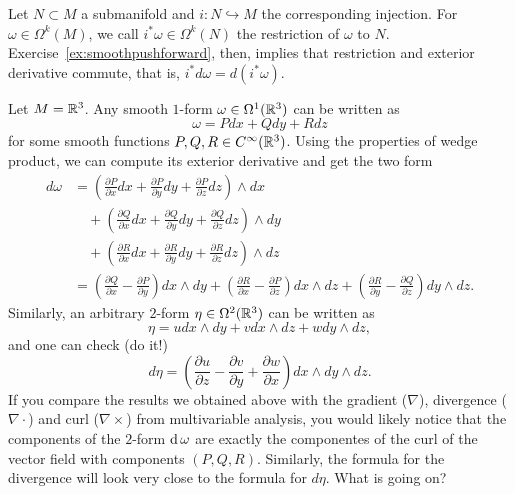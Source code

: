 Let $N\subset M$ a submanifold and $i:N\hookrightarrow M$ the corresponding injection.
For $\omega\in\Omega^k(M)$, we call $i^*\omega \in \Omega^k(N)$ the restriction of $\omega$ to $N$.
Exercise~\ref{ex:smoothpushforward}, then, implies that restriction and exterior derivative commute, that is, $i^*d\omega = d(i^*\omega)$.

\begin{example}
  Let $M=\mathbb{R}^3$. Any smooth $1$-form $\omega\in\Omega^1(\mathbb{R}^3)$ can be written as
  \begin{equation}
    \omega = P dx + Q dy + R dz
  \end{equation}
  for some smooth functions $P,Q,R\in C^\infty(\mathbb{R}^3)$.
  Using the properties of wedge product, we can compute its exterior derivative and get the two form
  \begin{align}
    d\omega &= \left(\frac{\partial P}{\partial x} dx + \frac{\partial P}{\partial y} dy + \frac{\partial P}{\partial z} dz \right) \wedge dx \\
      &\quad+\left(\frac{\partial Q}{\partial x} dx + \frac{\partial Q}{\partial y} dy + \frac{\partial Q}{\partial z} dz \right) \wedge dy \\
      &\quad+\left(\frac{\partial R}{\partial x} dx + \frac{\partial R}{\partial y} dy + \frac{\partial R}{\partial z} dz \right) \wedge dz \\
    &= \left(\frac{\partial Q}{\partial x} - \frac{\partial P}{\partial y}\right) dx \wedge dy + 
    \left(\frac{\partial R}{\partial x} - \frac{\partial P}{\partial z}\right) dx \wedge dz + \left(\frac{\partial R}{\partial y} - \frac{\partial Q}{\partial z}\right) dy \wedge dz.
  \end{align}
  Similarly, an arbitrary $2$-form $\eta\in\Omega^2(\mathbb{R}^3)$ can be written as
  \begin{equation}
    \eta = u dx\wedge dy + v dx\wedge dz + w dy\wedge dz,
  \end{equation}
  and one can check (do it!)
  \begin{equation}
    d\eta = \left(\frac{\partial u}{\partial z}-\frac{\partial v}{\partial y} + \frac{\partial w}{\partial x}\right) dx\wedge dy \wedge dz.
  \end{equation}
  If you compare the results we obtained above with the gradient ($\nabla$), divergence ($\nabla\cdot$) and curl ($\nabla\times$) from multivariable analysis, you would likely notice that the components of the $2$-form $\operatorname{d}\omega$ are exactly the componentes of the curl of the vector field with components $(P, Q, R)$.
  Similarly, the formula for the divergence will look very close to the formula for $d\eta$. 
  What is going on?
  

\end{example}
